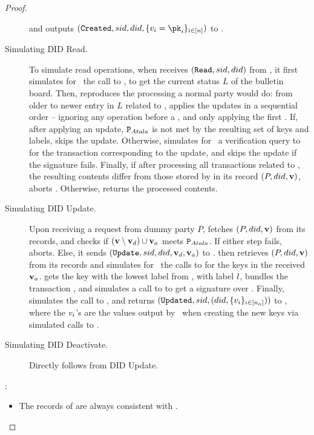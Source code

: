 \begin{proof}
\begin{description}
    and \IdealGPKIDID outputs $(\uccmd{Created},\sid,\did,\lbrace \val_i=\pk_i
    \rbrace_{i\in[n]})$ to \IdealGPKIDID.
  \item[Simulating DID Read.]
    To simulate read operations, when \Sim receives $(\uccmd{Read},\sid,\did)$
    from \IdealGPKIDID, it first simulates for \adv~the call to \IdealGdledger, to
    get the current status $L$ of the bulletin board. Then, \Sim reproduces the
    processing a normal party would do: from older to newer entry in $L$ related
    to \did, applies the updates in a sequential order -- ignoring any
     operation before a , and only applying
    the first . If, after applying an update, $\P_{Atala}$ is
    not met by the resulting set of keys and labels, \Sim skips the update.
    Otherwise, \Sim simulates for \adv~a verification query to \IdealFSig for
    the transaction corresponding to the update, and skips the update if the
    signature fails.
    Finally, if after processing all transactions related to \did, the resulting
    contents differ from those stored by \Sim in its record $(P,\did,\sval)$,
    \Sim aborts . Otherwise, \Sim returns the processed
    contents.    
  \item[Simulating DID Update.]
    Upon receiving a request from dummy party $P$, \IdealGPKIDID fetches
    $(P,\did,\sval)$ from its records, and checks if $(\sval \setminus \sval_d)
    \cup \sval_a$ meets $\P_{Atala}$. If either step fails, \IdealGPKIDID
    aborts. Else, it sends $(\uccmd{Update},\sid,\did,\sval_d,\sval_a)$ to \Sim.
    \Sim then retrieves $(P,\did,\sval)$ from its records  and simulates for \adv~the calls to \IdealFSig for the
    keys in the received $\sval_a$. \Sim gets the key with the lowest label from
    \sval, with label $\lbl$, bundles the transaction \tx, and simulates a call
    to \IdealFSig to get a signature over \tx. Finally, \Sim simulates the call
    to \IdealGdledger, and returns $(\uccmd{Updated},\sid,(\did,\lbrace \val_i
    \rbrace_{i\in[n_a]}))$ to \IdealGPKIDID, where the $\val_i$'s are the values
    output by \adv~when creating the new keys via simulated calls to \IdealFSig.
  \item[Simulating DID Deactivate.] Directly follows from DID Update.      
  \end{description}
  :
  \begin{itemize}
  \item The records of \Sim are always consistent with \IdealGdledger.
  \end{itemize}


\end{proof}
